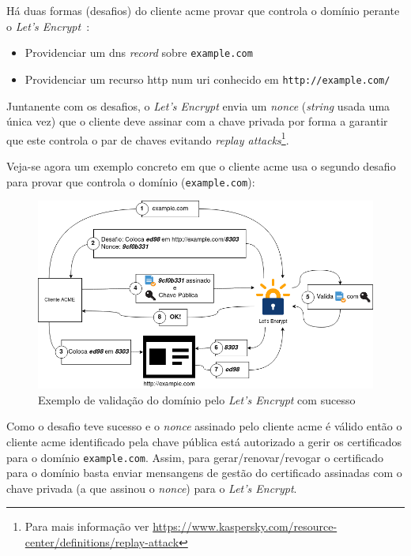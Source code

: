 Há duas formas (desafios) do cliente \acrshort{acme} provar que controla o domínio perante o \textit{Let's Encrypt}~\cite{domainValidation}:
\begin{itemize}
    \item Providenciar um \acrshort{dns} \textit{record} sobre \texttt{example.com}
    \item Providenciar um recurso \acrshort{http} num \acrshort{uri} conhecido em \texttt{http://example.com/}
\end{itemize}

Juntanente com os desafios, o \textit{Let's Encrypt} envia um \textit{nonce} (\textit{string} usada uma única vez) que o cliente deve assinar com a chave privada por forma a garantir que este controla o par de chaves evitando \textit{replay attacks}\footnote{Para mais informação ver \url{https://www.kaspersky.com/resource-center/definitions/replay-attack}}.

Veja-se agora um exemplo concreto em que o cliente \acrshort{acme} usa o segundo desafio para provar que controla o domínio (\texttt{example.com}):

\begin{figure}[H]
    \begin{center}
        \includegraphics[width=1\textwidth]{img/domainValidation.png}
    \end{center}
    \caption{Exemplo de validação do domínio pelo \textit{Let's Encrypt} com sucesso}
\end{figure}

Como o desafio teve sucesso e o \textit{nonce} assinado pelo cliente \acrshort{acme} é válido então o cliente \acrshort{acme} identificado pela chave pública está autorizado a gerir os certificados para o domínio \texttt{example.com}. Assim, para gerar/renovar/revogar o certificado para o domínio basta enviar mensangens de gestão do certificado assinadas com o chave privada (a que assinou o \textit{nonce}) para o \textit{Let's Encrypt}.

